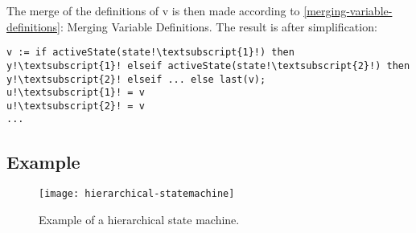 The merge of the definitions of v is then made according to \cref{merging-variable-definitions}:
Merging Variable Definitions. The result is after
simplification:
\begin{lstlisting}[language=modelica,escapechar=!]
v := if activeState(state!\textsubscript{1}!) then y!\textsubscript{1}! elseif activeState(state!\textsubscript{2}!) then y!\textsubscript{2}! elseif ... else last(v);
u!\textsubscript{1}! = v
u!\textsubscript{2}! = v
...
\end{lstlisting}

\subsection{Example}\label{example}

\begin{figure}[H]
  \begin{center}
    \texttt{[image: hierarchical-statemachine]}
  \end{center}
  \caption{Example of a hierarchical state machine.}
  \label{fig:hierarchical-statemachine}
\end{figure}

